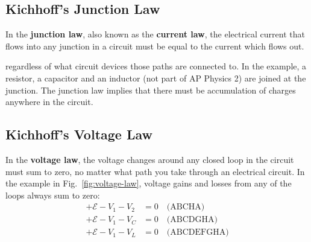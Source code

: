 \subsection{Kichhoff's Junction Law}
In the \textbf{junction law}, also known as the \textbf{current law}, the
electrical current that flows into any junction in a circuit must be equal to
the current which flows out.

%    
%
%
regardless of what circuit devices those paths are connected to. In the
example, a resistor, a capacitor and an inductor (not part of AP Physics 2) are
joined at the junction. The junction law implies that there must be
accumulation of charges anywhere in the circuit.



\subsection{Kichhoff's Voltage Law}

In the \textbf{voltage law}, the voltage changes around any closed loop in
the circuit must sum to zero, no matter what path you take through an
electrical circuit. In the example in Fig.~\ref{fig:voltage-law}, voltage gains
and losses from any of the loops always sum to zero:
\begin{align*}
  +\mathcal E-V_1-V_2 &= 0\quad\text{(ABCHA)}\\
  +\mathcal E-V_1-V_C &= 0\quad\text{(ABCDGHA)}\\
  +\mathcal E-V_1-V_L &=0\quad\text{(ABCDEFGHA)}
\end{align*}

